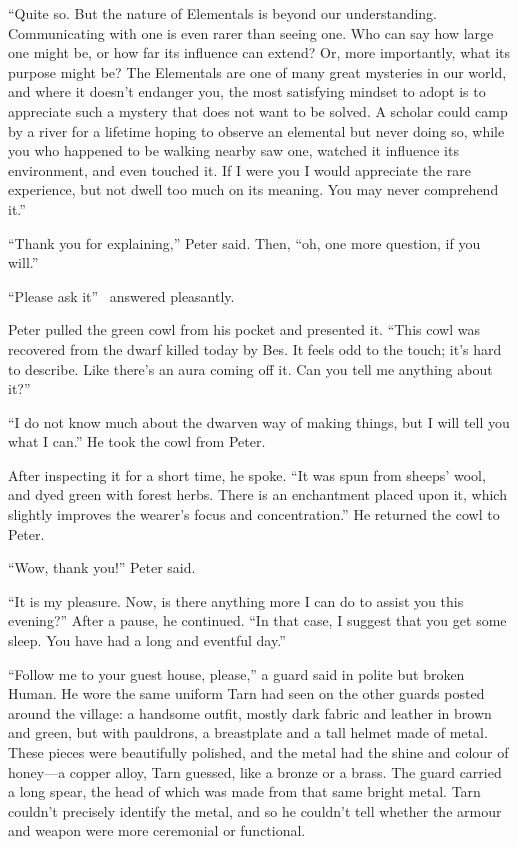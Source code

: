 ``Quite so.  But the nature of Elementals is beyond our understanding.  Communicating with one is even rarer than seeing one.  Who can say how large one might be, or how far its influence can extend?  Or, more importantly, what its purpose might be?  The Elementals are one of many great mysteries in our world, and where it doesn't endanger you, the most satisfying mindset to adopt is to appreciate such a mystery that does not want to be solved.  A scholar could camp by a river for a lifetime hoping to observe an elemental but never doing so, while you who happened to be walking nearby saw one, watched it influence its environment, and even touched it.  If I were you I would appreciate the rare experience, but not dwell too much on its meaning.  You may never comprehend it.''

``Thank you for explaining,'' Peter said.  Then, ``oh, one more question, if you will.''

``Please ask it'' \arilor\ answered pleasantly.

Peter pulled the green cowl from his pocket and presented it.  ``This cowl was recovered from the dwarf killed today by Bes.  It feels odd to the touch; it's hard to describe.  Like there's an aura coming off it.  Can you tell me anything about it?''

``I do not know much about the dwarven way of making things, but I will tell you what I can.''  He took the cowl from Peter.

After inspecting it for a short time, he spoke.  ``It was spun from sheeps' wool, and dyed green with forest herbs.  There is an enchantment placed upon it, which slightly improves the wearer's focus and concentration.''  He returned the cowl to Peter.

``Wow, thank you!'' Peter said.

``It is my pleasure.  Now, is there anything more I can do to assist you this evening?''  After a pause, he continued.  ``In that case, I suggest that you get some sleep.  You have had a long and eventful day.''

``Follow me to your guest house, please,'' a guard said in polite but broken Human.  He wore the same uniform Tarn had seen on the other guards posted around the village: a handsome outfit, mostly dark fabric and leather in brown and green, but with pauldrons, a breastplate and a tall helmet made of metal.  These pieces were beautifully polished, and the metal had the shine and colour of honey---a copper alloy, Tarn guessed, like a bronze or a brass.  The guard carried a long spear, the head of which was made from that same bright metal.  Tarn couldn't precisely identify the metal, and so he couldn't tell whether the armour and weapon were more ceremonial or functional.

